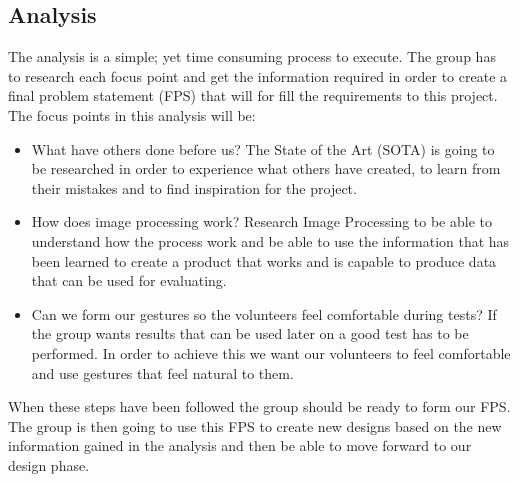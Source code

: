 \subsection{Analysis}
The analysis is a simple; yet time consuming process to execute. The group has to research each focus point and get the information required in order to create a final problem statement (FPS) that will for fill the requirements to this project. The focus points in this analysis will be:

\begin{itemize}
\item What have others done before us? \newline
The State of the Art (SOTA) is going to be researched in order to experience what others have created, to learn from their mistakes and to find inspiration for the project. 

\item How does image processing work? \newline
Research Image Processing to be able to understand how the process work and be able to use the information that has been learned to create a product that works and is capable to produce data that can be used for evaluating.

\item Can we form our gestures so the volunteers feel comfortable during tests? \newline
If the group wants results that can be used later on a good test has to be performed. In order to achieve this we want our volunteers to feel comfortable and use gestures that feel natural to them. 
\end{itemize} 

\pagebreak[1]
When these steps have been followed the group should be ready to form our FPS. The group is then going to use this FPS to create new designs based on the new information gained in the analysis and then be able to move forward to our design phase. 
